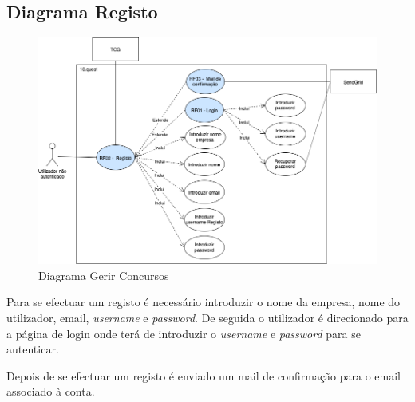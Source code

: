 \newpage

\subsection{Diagrama Registo}
\label{d:registo}
\begin{figure}[ht!]
	\begin{center}
		\includegraphics[width=1\textwidth]{img/rf/registo}
		\caption{Diagrama Gerir Concursos}
		\label{fig:rf-registo}
	\end{center}
\end{figure}

Para se efectuar um registo é necessário introduzir o nome da empresa, nome do utilizador, email, \textit{username} e \textit{password}. De seguida o utilizador é direcionado para a página de login onde terá de introduzir o \textit{username} e \textit{password} para se autenticar.

Depois de se efectuar um registo é enviado um mail de confirmação para o email associado à conta.

\newpage

